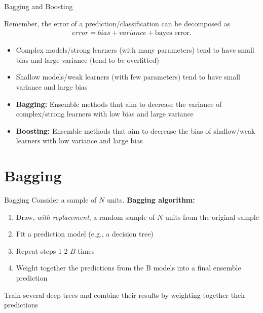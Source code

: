 \documentclass[11pt,aspectratio=1610,usenames,dvipsnames]{beamer} %
\begin{document}
\begin{frame}{Bagging and Boosting}
	
	Remember, the error of a prediction/classification can be decomposed as
	\begin{align*}
		error = bias + variance + \text{bayes error}.
	\end{align*}
	\begin{itemize}
		\item Complex models/strong learners (with many parameters) tend to have small bias and large variance (tend to be overfitted)
		\item Shallow models/weak learners (with few parameters) tend to have small variance and large bias
		\item \textbf{Bagging:} Ensemble methods that aim to decrease the variance of complex/strong learners with low bias and large variance
		\item \textbf{Boosting:} Ensemble methods that aim to decrease the bias of shallow/weak learners with low variance and large bias
	\end{itemize}
	
\end{frame}


\section{Bagging}

\begin{frame}{Bagging}
	Consider a sample of $N$ units.
	\textbf{Bagging algorithm:}
	\begin{enumerate}
		\item Draw, \textit{with replacement}, a random sample of $N$ units from the original sample
		\item Fit a prediction model (e.g., a decision tree)
		\item Repeat steps 1-2 $B$ times
		\item Weight together the predictions from the B models into a final ensemble prediction
	\end{enumerate}
	Train several deep trees and combine their results by weighting together their predictions
\end{frame}
\end{document}
